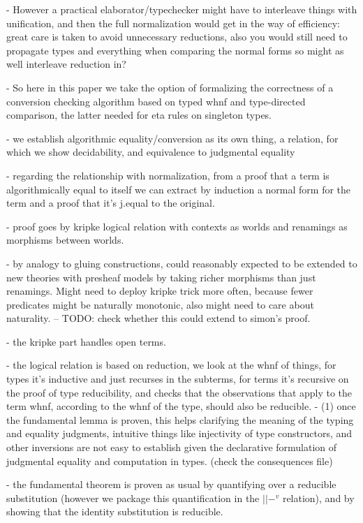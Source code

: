\documentclass{article}
\begin{document}
   - However a practical elaborator/typechecker might have to
   interleave things with unification, and then the full normalization
   would get in the way of efficiency: great care is taken to avoid
   unnecessary reductions, also you would still need to propagate
   types and everything when comparing the normal forms so might as
   well interleave reduction in?
   

 - So here in this paper we take the option of formalizing the
 correctness of a conversion checking algorithm based on typed whnf and
 type-directed comparison, the latter needed for eta rules on singleton types.

 - we establish algorithmic equality/conversion as its own thing, a
 relation, for which we show decidability, and equivalence to
 judgmental equality

 - regarding the relationship with normalization, from a proof that a
 term is algorithmically equal to itself we can extract by induction a
 normal form for the term and a proof that it's j.equal to the
 original.

 - proof goes by kripke logical relation with contexts as worlds and renamings as morphisms between worlds.
 
   - by analogy to gluing constructions, could reasonably expected to
   be extended to new theories with presheaf models by taking richer
   morphisms than just renamings.
   Might need to deploy kripke trick more often, because fewer
   predicates might be naturally monotonic, also might need to care
   about naturality.
   -- TODO: check whether this could extend to simon's proof.

 - the kripke part handles open terms.
   
 - the logical relation is based on reduction, we look at the whnf of
 things, for types it's inductive and just recurses in the subterms,
 for terms it's recursive on the proof of type reducibility, and checks that
 the observations that apply to the term whnf, according to the whnf of
 the type, should also be reducible.
   - (1) once the fundamental lemma is proven, this helps clarifying
     the meaning of the typing and equality
     judgments, intuitive things like injectivity of type constructors,
     and other inversions are not easy to establish given
     the declarative formulation of judgmental equality
     and computation in types. (check the consequences file)
 
   - the fundamental theorem is proven as usual by quantifying over a
   reducible substitution (however we package this quantification in
   the $||-^v$ relation), and by showing that the identity substitution
   is reducible.
 
\end{document}

